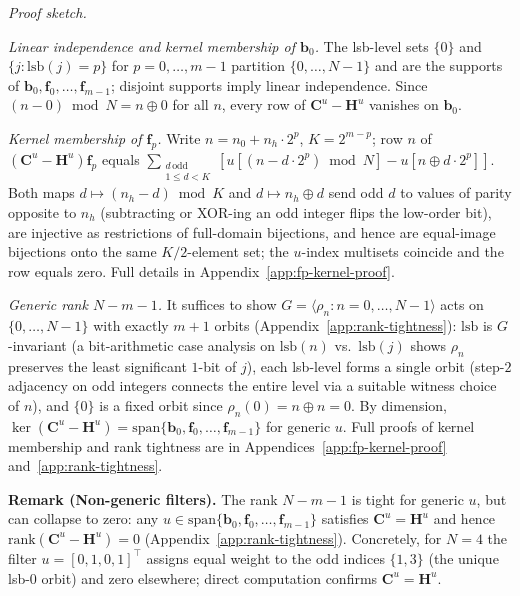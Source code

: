 \documentclass[11pt]{article}
\begin{document}
\noindent\textit{Proof sketch.}

\smallskip
\noindent\textit{Linear independence and kernel membership of $\mathbf{b}_0$.} The lsb-level sets $\{0\}$ and $\{j:\mathrm{lsb}(j)=p\}$ for $p=0,\ldots,m-1$ partition $\{0,\ldots,N-1\}$ and are the supports of $\mathbf{b}_0,\mathbf{f}_0,\ldots,\mathbf{f}_{m-1}$; disjoint supports imply linear independence. Since $(n-0)\bmod N = n\oplus 0$ for all $n$, every row of $\mathbf{C}^u-\mathbf{H}^u$ vanishes on $\mathbf{b}_0$.

\smallskip
\noindent\textit{Kernel membership of $\mathbf{f}_p$.} Write $n=n_0+n_h\cdot 2^p$, $K=2^{m-p}$; row $n$ of $(\mathbf{C}^u-\mathbf{H}^u)\mathbf{f}_p$ equals $\sum_{\substack{d\,\mathrm{odd}\\1\le d<K}}[u[(n-d\cdot 2^p)\bmod N]-u[n\oplus d\cdot 2^p]]$. Both maps $d\mapsto(n_h-d)\bmod K$ and $d\mapsto n_h\oplus d$ send odd $d$ to values of parity opposite to $n_h$ (subtracting or XOR-ing an odd integer flips the low-order bit), are injective as restrictions of full-domain bijections, and hence are equal-image bijections onto the same $K/2$-element set; the $u$-index multisets coincide and the row equals zero. Full details in Appendix~\ref{app:fp-kernel-proof}.

\smallskip
\noindent\textit{Generic rank $N-m-1$.} It suffices to show $G=\langle\rho_n : n=0,\ldots,N-1\rangle$ acts on $\{0,\ldots,N-1\}$ with exactly $m+1$ orbits (Appendix~\ref{app:rank-tightness}): $\mathrm{lsb}$ is $G$-invariant (a bit-arithmetic case analysis on $\mathrm{lsb}(n)$ vs.\ $\mathrm{lsb}(j)$ shows $\rho_n$ preserves the least significant $1$-bit of $j$), each lsb-level forms a single orbit (step-$2$ adjacency on odd integers connects the entire level via a suitable witness choice of $n$), and $\{0\}$ is a fixed orbit since $\rho_n(0)=n\oplus n=0$. By dimension, $\ker(\mathbf{C}^u-\mathbf{H}^u)=\mathrm{span}\{\mathbf{b}_0,\mathbf{f}_0,\ldots,\mathbf{f}_{m-1}\}$ for generic $u$. Full proofs of kernel membership and rank tightness are in Appendices~\ref{app:fp-kernel-proof} and~\ref{app:rank-tightness}.

\medskip
\noindent\textbf{Remark (Non-generic filters).} The rank $N-m-1$ is tight for generic $u$, but can collapse to zero: any $u\in\mathrm{span}\{\mathbf{b}_0,\mathbf{f}_0,\ldots,\mathbf{f}_{m-1}\}$ satisfies $\mathbf{C}^u=\mathbf{H}^u$ and hence $\mathrm{rank}(\mathbf{C}^u-\mathbf{H}^u)=0$ (Appendix~\ref{app:rank-tightness}). Concretely, for $N=4$ the filter $u=[0,1,0,1]^\top$ assigns equal weight to the odd indices $\{1,3\}$ (the unique lsb-$0$ orbit) and zero elsewhere; direct computation confirms $\mathbf{C}^u=\mathbf{H}^u$.
\end{document}
